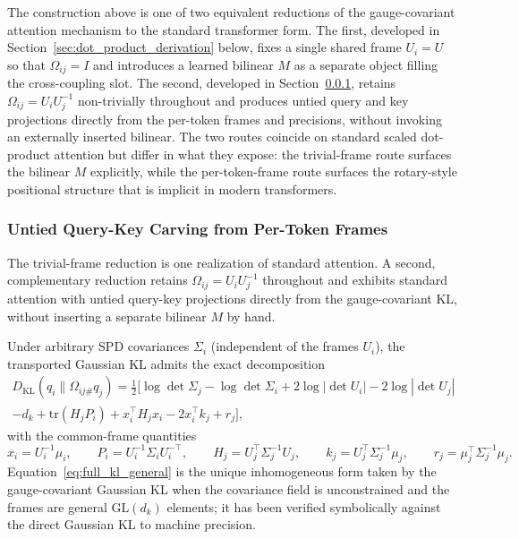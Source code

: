 \documentclass[11pt]{article}
\begin{document}
The construction above is one of two equivalent reductions of the gauge-covariant attention mechanism to the standard transformer form. The first, developed in Section~\ref{sec:dot_product_derivation} below, fixes a single shared frame $U_i = U$ so that $\Omega_{ij} = I$ and introduces a learned bilinear $M$ as a separate object filling the cross-coupling slot. The second, developed in Section~\ref{sec:untied_qk}, retains $\Omega_{ij} = U_iU_j^{-1}$ non-trivially throughout and produces untied query and key projections directly from the per-token frames and precisions, without invoking an externally inserted bilinear. The two routes coincide on standard scaled dot-product attention but differ in what they expose: the trivial-frame route surfaces the bilinear $M$ explicitly, while the per-token-frame route surfaces the rotary-style positional structure that is implicit in modern transformers.

\subsubsection{Untied Query-Key Carving from Per-Token Frames}
\label{sec:untied_qk}

The trivial-frame reduction is one realization of standard attention. A second, complementary reduction retains $\Omega_{ij} = U_iU_j^{-1}$ throughout and exhibits standard attention with untied query-key projections directly from the gauge-covariant KL, without inserting a separate bilinear $M$ by hand.

Under arbitrary SPD covariances $\Sigma_i$ (independent of the frames $U_i$), the transported Gaussian KL admits the exact decomposition
\begin{multline}
D_{\mathrm{KL}}(q_i \| \Omega_{ij\#}q_j) = \tfrac{1}{2}\Big[\log\det\Sigma_j - \log\det\Sigma_i + 2\log|\det U_i| - 2\log|\det U_j| \\
 - d_k + \mathrm{tr}(H_j P_i) + x_i^\top H_j x_i - 2x_i^\top k_j + r_j\Big],
\label{eq:full_kl_general}
\end{multline}
with the common-frame quantities
\begin{equation}
x_i = U_i^{-1}\mu_i, \qquad P_i = U_i^{-1}\Sigma_i U_i^{-\top}, \qquad H_j = U_j^\top \Sigma_j^{-1} U_j, \qquad k_j = U_j^\top \Sigma_j^{-1}\mu_j, \qquad r_j = \mu_j^\top \Sigma_j^{-1}\mu_j.
\end{equation}
Equation~\eqref{eq:full_kl_general} is the unique inhomogeneous form taken by the gauge-covariant Gaussian KL when the covariance field is unconstrained and the frames are general $\mathrm{GL}(d_k)$ elements; it has been verified symbolically against the direct Gaussian KL to machine precision.
\end{document}
